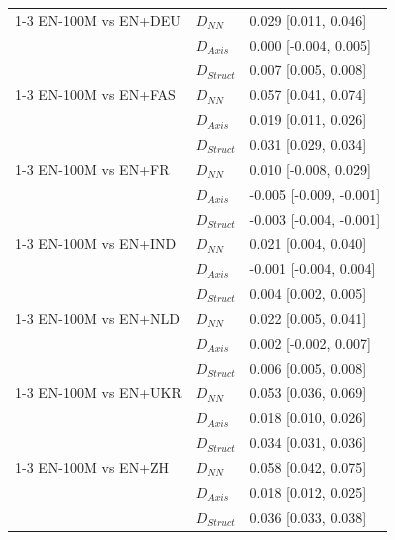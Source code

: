 \begin{tabular}{@{}lll@{}}
\cmidrule(lr){1-3}
EN-100M vs EN+DEU & $D_{NN}$ & 0.029 [0.011, 0.046] \\
 & $D_{Axis}$ & 0.000 [-0.004, 0.005] \\
 & $D_{Struct}$ & 0.007 [0.005, 0.008] \\
\cmidrule(lr){1-3}
EN-100M vs EN+FAS & $D_{NN}$ & 0.057 [0.041, 0.074] \\
 & $D_{Axis}$ & 0.019 [0.011, 0.026] \\
 & $D_{Struct}$ & 0.031 [0.029, 0.034] \\
\cmidrule(lr){1-3}
EN-100M vs EN+FR & $D_{NN}$ & 0.010 [-0.008, 0.029] \\
 & $D_{Axis}$ & -0.005 [-0.009, -0.001] \\
 & $D_{Struct}$ & -0.003 [-0.004, -0.001] \\
\cmidrule(lr){1-3}
EN-100M vs EN+IND & $D_{NN}$ & 0.021 [0.004, 0.040] \\
 & $D_{Axis}$ & -0.001 [-0.004, 0.004] \\
 & $D_{Struct}$ & 0.004 [0.002, 0.005] \\
\cmidrule(lr){1-3}
EN-100M vs EN+NLD & $D_{NN}$ & 0.022 [0.005, 0.041] \\
 & $D_{Axis}$ & 0.002 [-0.002, 0.007] \\
 & $D_{Struct}$ & 0.006 [0.005, 0.008] \\
\cmidrule(lr){1-3}
EN-100M vs EN+UKR & $D_{NN}$ & 0.053 [0.036, 0.069] \\
 & $D_{Axis}$ & 0.018 [0.010, 0.026] \\
 & $D_{Struct}$ & 0.034 [0.031, 0.036] \\
\cmidrule(lr){1-3}
EN-100M vs EN+ZH & $D_{NN}$ & 0.058 [0.042, 0.075] \\
 & $D_{Axis}$ & 0.018 [0.012, 0.025] \\
 & $D_{Struct}$ & 0.036 [0.033, 0.038] \\
\bottomrule
\end{tabular}
